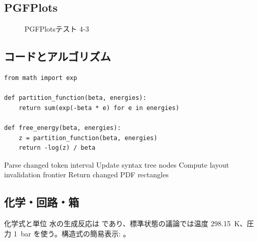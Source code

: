 \documentclass[12pt,a4paper,openany]{ltjsbook}
\theoremstyle{definition}
\theoremstyle{plain}
\theoremstyle{remark}
\begin{document}
\subsection{PGFPlots}
\begin{figure}[H]
\centering
{}
\caption{PGFPlotsテスト 4-3}\label{fig:pgfplots-4-3}
\end{figure}

\subsection{コードとアルゴリズム}
\begin{lstlisting}[style=pythonstyle,caption={Python風擬似コード 4-3}]
from math import exp

def partition_function(beta, energies):
    return sum(exp(-beta * e) for e in energies)

def free_energy(beta, energies):
    z = partition_function(beta, energies)
    return -log(z) / beta
\end{lstlisting}

\begin{algorithm}[H]
\caption{差分プレビュー更新アルゴリズム 4-3}
Parse changed token interval\;
Update syntax tree nodes\;
Compute layout invalidation frontier\;
Return changed PDF rectangles\;
\end{algorithm}

\subsection{化学・回路・箱}
\begin{greenbox}{化学式と単位}
水の生成反応は  であり、標準状態の議論では温度 \SI{298.15}{\kelvin}、圧力 \SI{1}{\bar} を使う。構造式の簡易表示: 。
\end{greenbox}
\end{document}
